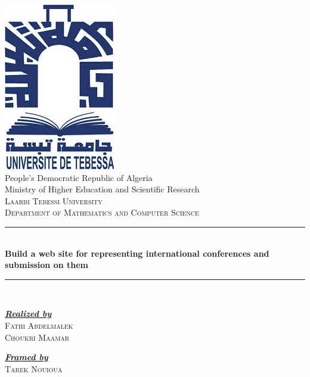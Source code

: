 \begin{titlepage}
	\begin{center}
		\includegraphics[]{./pics/univ-tebessa.jpg}\\[1cm]
		People's Democratic Republic of Algeria\\
		Ministry of Higher Education and Scientific Research\\[0.4cm]
		\textsc{\LARGE Laarbi Tebessi University}\\[0.4cm]
		\textsc{\large Department of Mathematics and Computer Science}\\[0.5cm]
		\rule{\textwidth}{0.075cm}\\[0.4cm]
		{\huge \bfseries Build a web site for representing international conferences and submission on them \\[1cm] }
		\rule{\textwidth}{0.075cm}\\[1.5cm]
		\begin{minipage}{0.4\textwidth}
			\begin{flushleft} \large
				\emph{\textbf{\underline{Realized by}}}\\
				\textsc{Fathi Abdelmalek}\\
				\textsc{Choukri Maamar}
			\end{flushleft}
		\end{minipage}
		\begin{minipage}{0.4\textwidth}
			\begin{flushright} \large
				\emph{\textbf{\underline{Framed by}}} \\
				\textsc{Tarek Nouioua}
			\end{flushright}
		\end{minipage}
		\vfill
	\end{center}
\end{titlepage}